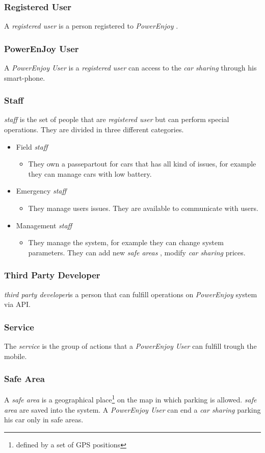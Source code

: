 \documentclass[english]{article}
\newcommand{\carsharing}{\textit {car sharing }}
\newcommand{\powerenjoy}{\textit{PowerEnjoy }}
\newcommand{\registereduser}{\textit {registered user }}
\newcommand{\powerenjoyuser}{\textit{PowerEnjoy User }}
\newcommand{\staff}{\textit{staff }}
\newcommand{\service}{\textit{service }}
\newcommand{\safearea}{\textit{safe area }}
\newcommand{\safeareas}{\textit{safe areas }}
\newcommand{\thirdparty}{\textit{third party developer}}
\begin{document}
		\subsubsection{Registered User} 
			A \registereduser is a person registered to \powerenjoy.
		\subsubsection{PowerEnJoy User}
			A \powerenjoyuser is a \registereduser can access to the \carsharing through his smart-phone.
		\subsubsection{Staff}
			\staff is the set of people that are \registereduser  but can perform special operations. They are divided in three different categories.
			\begin{itemize}
				\item {Field \staff}
				\begin{itemize}
				\item They own a passepartout for cars that has all kind of issues, for example they can manage cars with low battery.
				\end{itemize}
				\item{Emergency \staff}
				\begin{itemize}
				\item They manage users issues. They are available to communicate with users.
				\end{itemize}
				\item{Management \staff}
				\begin{itemize}
				\item They manage the system, for example they can change system parameters. They can add new \safeareas, modify \carsharing prices.
				\end{itemize}
			\end{itemize}
		\subsubsection{Third Party Developer}
			\thirdparty is a person that can fulfill operations on \powerenjoy system via API.
		\subsubsection{Service}
			The \service is the group of actions that a \powerenjoyuser can fulfill trough the mobile.	
		\subsubsection {Safe Area}
			A \safearea is a  geographical place\footnote{defined by a set of GPS positions} on the map in which parking is allowed. \safearea are saved into the system. A \powerenjoyuser can end a \carsharing parking his car only in safe areas.
\end{document}
